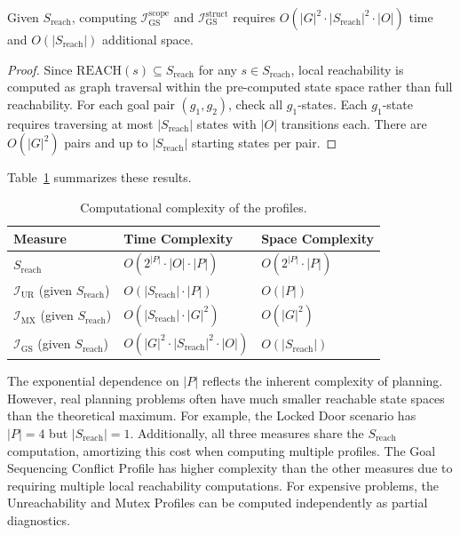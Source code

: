 \begin{prop}
    \label{prop:gs_complexity}
    Given $S_{\text{reach}}$, computing $\mathcal{I}^{\text{scope}}_{\text{GS}}$ and $\mathcal{I}^{\text{struct}}_{\text{GS}}$ requires $O(|G|^2 \cdot |S_{\text{reach}}|^2 \cdot |O|)$ time and $O(|S_{\text{reach}}|)$ additional space.
\end{prop}
\begin{proof}
    Since $\text{REACH}(s) \subseteq S_{\text{reach}}$ for any $s \in S_{\text{reach}}$, local reachability is computed as graph traversal within the pre-computed state space rather than full reachability. For each goal pair $(g_1, g_2)$, check all $g_1$-states. Each $g_1$-state requires traversing at most $|S_{\text{reach}}|$ states with $|O|$ transitions each. There are $O(|G|^2)$ pairs and up to $|S_{\text{reach}}|$ starting states per pair.
\end{proof}

Table~\ref{tab:complexity} summarizes these results.

\begin{table}[ht]
    \centering
    \begin{tabular}{lll}
        \toprule
        Measure                                              & Time Complexity                                 & Space Complexity        \\
        \midrule
        $S_{\text{reach}}$                                   & $O(2^{|P|} \cdot |O| \cdot |P|)$                & $O(2^{|P|} \cdot |P|)$  \\
        $\mathcal{I}_{\text{UR}}$ (given $S_{\text{reach}}$) & $O(|S_{\text{reach}}| \cdot |P|)$               & $O(|P|)$                \\
        $\mathcal{I}_{\text{MX}}$ (given $S_{\text{reach}}$) & $O(|S_{\text{reach}}| \cdot |G|^2)$             & $O(|G|^2)$              \\
        $\mathcal{I}_{\text{GS}}$ (given $S_{\text{reach}}$) & $O(|G|^2 \cdot |S_{\text{reach}}|^2 \cdot |O|)$ & $O(|S_{\text{reach}}|)$ \\
        \bottomrule
    \end{tabular}
    \caption{Computational complexity of the profiles.}
    \label{tab:complexity}
\end{table}

The exponential dependence on $|P|$ reflects the inherent complexity of planning. However, real planning problems often have much smaller reachable state spaces than the theoretical maximum. For example, the Locked Door scenario has $|P| = 4$ but $|S_{\text{reach}}| = 1$. Additionally, all three measures share the $S_{\text{reach}}$ computation, amortizing this cost when computing multiple profiles. The Goal Sequencing Conflict Profile has higher complexity than the other measures due to requiring multiple local reachability computations. For expensive problems, the Unreachability and Mutex Profiles can be computed independently as partial diagnostics.

